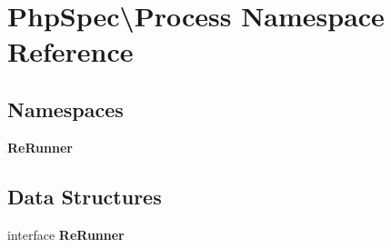 \section{Php\+Spec\textbackslash{}Process Namespace Reference}
\label{namespace_php_spec_1_1_process}
\subsection*{Namespaces}
\begin{DoxyCompactItemize}
\item 
 {\bf Re\+Runner}
\end{DoxyCompactItemize}
\subsection*{Data Structures}
\begin{DoxyCompactItemize}
\item 
interface {\bf Re\+Runner}
\end{DoxyCompactItemize}
